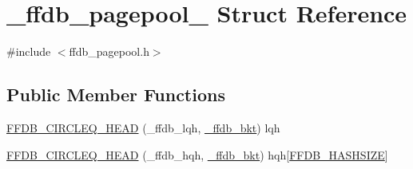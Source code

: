 \hypertarget{struct__ffdb__pagepool__}{}\section{\+\_\+ffdb\+\_\+pagepool\+\_\+ Struct Reference}
\label{struct__ffdb__pagepool__}


{\ttfamily \#include $<$ffdb\+\_\+pagepool.\+h$>$}

\subsection*{Public Member Functions}
\begin{DoxyCompactItemize}
\item 
\mbox{\hyperlink{struct__ffdb__pagepool___a79c89b7ffac9b5303ed9e38be070120e}{F\+F\+D\+B\+\_\+\+C\+I\+R\+C\+L\+E\+Q\+\_\+\+H\+E\+AD}} (\+\_\+ffdb\+\_\+lqh, \mbox{\hyperlink{struct__ffdb__bkt}{\+\_\+ffdb\+\_\+bkt}}) lqh
\item 
\mbox{\hyperlink{struct__ffdb__pagepool___a96aa19721486d848d70d403dad214389}{F\+F\+D\+B\+\_\+\+C\+I\+R\+C\+L\+E\+Q\+\_\+\+H\+E\+AD}} (\+\_\+ffdb\+\_\+hqh, \mbox{\hyperlink{struct__ffdb__bkt}{\+\_\+ffdb\+\_\+bkt}}) hqh\mbox{[}\mbox{\hyperlink{ffdb__pagepool_8h_abe1c2fbde9b4b6a95b8a164d7479286f}{F\+F\+D\+B\+\_\+\+H\+A\+S\+H\+S\+I\+ZE}}\mbox{]}
\end{DoxyCompactItemize}
